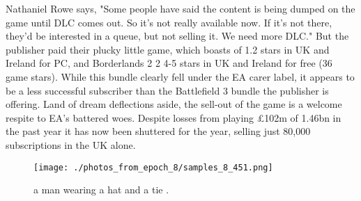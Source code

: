 \documentclass{article}%
\begin{document}
Nathaniel Rowe says, "Some people have said the content is being dumped on the game until DLC comes out. So it's not really available now. If it's not there, they'd be interested in a queue, but not selling it. We need more DLC."\newline%
But the publisher paid their plucky little game, which boasts of 1.2 stars in UK and Ireland for PC, and Borderlands 2 2 4{-}5 stars in UK and Ireland for free (36 game stars). While this bundle clearly fell under the EA carer label, it appears to be a less successful subscriber than the Battlefield 3 bundle the publisher is offering.\newline%
Land of dream deflections aside, the sell{-}out of the game is a welcome respite to EA’s battered woes. Despite losses from playing £102m of 1.46bn in the past year it has now been shuttered for the year, selling just 80,000 subscriptions in the UK alone.\newline%

%


\begin{figure}[h!]%
\centering%
\texttt{[image: ./photos\_from\_epoch\_8/samples\_8\_451.png]}%
\caption{a man wearing a hat and a tie .}%
\end{figure}

%
\end{document}
